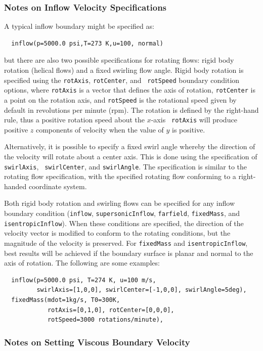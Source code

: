 \documentclass{article}
\begin{document}
\subsubsection{ Notes on Inflow Velocity Specifications}

A typical inflow boundary might be specified as:
\begin{verbatim}
  inflow(p=5000.0 psi,T=273 K,u=100, normal)
\end{verbatim}
but there are also two possible specifications for rotating flows: rigid body rotation
(helical flows) and a fixed swirling flow angle.  Rigid body rotation
is specified using the {\tt rotAxis}, {\tt rotCenter}, and {\tt
rotSpeed} boundary condition options, where {\tt rotAxis} is a vector
that defines the axis of rotation, {\tt rotCenter} is a point on the
rotation axis, and {\tt rotSpeed} is the rotational speed given by
default in revolutions per minute (rpm).  The rotation is defined by the
right-hand rule, thus a positive rotation speed about the $x$-axis {\tt
rotAxis} will produce positive $z$ components of velocity when the value
of $y$ is positive.

Alternatively, it is possible to specify a fixed swirl angle whereby
the direction of the velocity will rotate about a center axis.  This
is done using the specification of {\tt swirlAxis}, {\tt
swirlCenter}, and {\tt swirlAngle}.  The specification is similar to
the rotating flow specification, with the specified rotating flow
conforming to a right-handed coordinate system.

Both rigid body rotation and swirling flows can be specified for any
inflow boundary condition ({\tt inflow}, {\tt supersonicInflow}, {\tt farfield}, {\tt fixedMass},
and {\tt isentropicInflow}).  When these conditions are specified, the
direction of the velocity vector is modified to conform to the
rotating conditions, but the magnitude of the velocity is preserved.
For {\tt fixedMass} and {\tt isentropicInflow}, best results
will be achieved if the boundary surface is planar and normal to the
axis of rotation.  The following are some examples:

\begin{verbatim}
  inflow(p=5000.0 psi, T=274 K, u=100 m/s, 
         swirlAxis=[1,0,0], swirlCenter=[-1,0,0], swirlAngle=5deg),
  fixedMass(mdot=1kg/s, T0=300K, 
            rotAxis=[0,1,0], rotCenter=[0,0,0], 
            rotSpeed=3000 rotations/minute),
\end{verbatim}

\subsubsection{ Notes on Setting Viscous Boundary Velocity }
\end{document}
